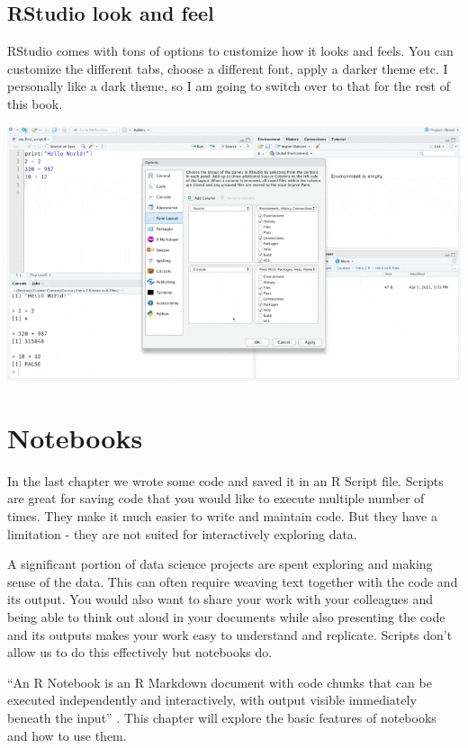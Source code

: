 \documentclass[
]{book}
\begin{document}
\hypertarget{rstudio-look-and-feel}{%
\section{RStudio look and feel}\label{rstudio-look-and-feel}}

RStudio comes with tons of options to customize how it looks and feels. You can customize the different tabs, choose a different font, apply a darker theme etc. I personally like a dark theme, so I am going to switch over to that for the rest of this book.

\includegraphics{assets/ch_1-setup/gifs/dark.gif}

\hypertarget{notebooks}{%
\chapter{Notebooks}\label{notebooks}}

In the last chapter we wrote some code and saved it in an R Script file. Scripts are great for saving code that you would like to execute multiple number of times. They make it much easier to write and maintain code. But they have a limitation - they are not suited for interactively exploring data.

A significant portion of data science projects are spent exploring and making sense of the data. This can often require weaving text together with the code and its output. You would also want to share your work with your colleagues and being able to think out aloud in your documents while also presenting the code and its outputs makes your work easy to understand and replicate. Scripts don't allow us to do this effectively but notebooks do.

``An R Notebook is an R Markdown document with code chunks that can be executed independently and interactively, with output visible immediately beneath the input'' \citep{xie2019}. This chapter will explore the basic features of notebooks and how to use them.
\end{document}
